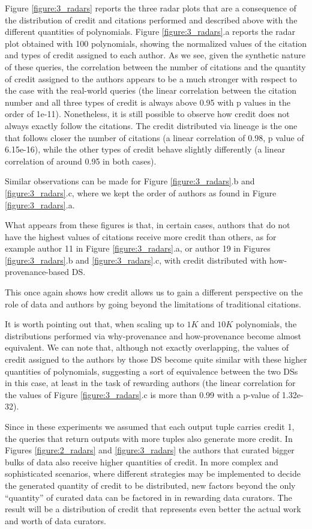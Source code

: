 Figure \ref{figure:3_radars} reports the three radar plots that are a consequence of the distribution of credit and citations performed and described above with the different quantities of polynomials. 
Figure \ref{figure:3_radars}.a reports the radar plot obtained with 100 polynomials, showing the normalized values of the citation and types of credit assigned to each author. 
As we see, given the synthetic nature of these queries, the correlation between the number of citations and the quantity of credit assigned to the authors appears to be a much stronger with respect to the case with the real-world queries (the linear correlation between the citation number and all three types of credit is always above 0.95 with p values in the order of 1e-11).
Nonetheless, it is still possible to observe how credit does not always exactly follow the citations. 
The credit distributed via lineage is the one that follows closer the number of citations (a linear correlation of 0.98, p value of 6.15e-16), while the other types of credit behave slightly differently (a linear correlation of around 0.95 in both cases).  

Similar observations can be made for Figure \ref{figure:3_radars}.b and \ref{figure:3_radars}.c, where we kept the order of authors as found in Figure \ref{figure:3_radars}.a.

What appears from these figures is that, in certain cases, authors that do not have the highest values of citations receive more credit than others, as for example author 11 in Figure \ref{figure:3_radars}.a, or author 19 in Figures \ref{figure:3_radars}.b and \ref{figure:3_radars}.c, with credit distributed with how-provenance-based DS.

This once again shows how credit allows us to gain a different perspective on the role of data and authors by going beyond the limitations of traditional citations.  

It is worth pointing out that, when scaling up to $1K$ and $10K$ polynomials, the distributions performed via why-provenance and how-provenance become almost equivalent. We can note that, although not exactly overlapping, the values of credit assigned to the authors by those DS become quite similar with these higher quantities of polynomials, suggesting a sort of equivalence between the two DSs in this case, at least in the task of rewarding authors (the linear correlation for the values of Figure \ref{figure:3_radars}.c is more than 0.99 with a p-value of 1.32e-32). 

Since in these experiments we assumed that each output tuple carries credit 1, the queries that return outputs with more tuples also generate more credit.
In Figures \ref{figure:2_radars} and \ref{figure:3_radars} the authors that curated bigger bulks of data also receive higher quantities of credit.
In more complex and sophisticated scenarios, where different strategies may be implemented to decide the generated quantity of credit to be distributed, new factors beyond the only ``quantity'' of curated data can be factored in in rewarding data curators.
The result will be a distribution of credit that represents even better the actual work and worth of data curators.


